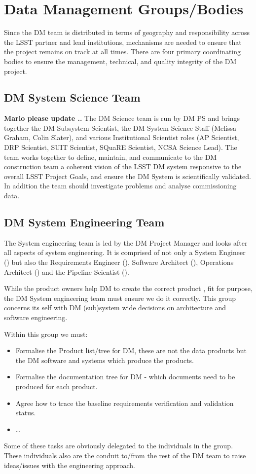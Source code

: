 \section{Data Management Groups/Bodies} \label{sect:groups}
Since the DM team is distributed in terms of geography and responsibility across the LSST partner and lead institutions, mechanisms are needed to ensure that the project remains on track at all times.  There are four primary coordinating bodies to ensure the management, technical, and quality integrity of the DM project.

\subsection{DM System Science Team \label{sect:dmsst}}
{\bf Mario  please update ..}
The DM Science team is run by DM PS and brings together the DM Subsystem Scientist, the DM System Science Staff (Melissa Graham, Colin Slater), and various Institutional Scientist roles (AP Scientist, DRP Scientist, SUIT Scientist, SQuaRE Scientist, NCSA Science Lead).
The team works together to define, maintain, and communicate to the DM construction team a coherent vision of the LSST DM system responsive to the overall LSST Project Goals, and ensure the DM System is scientifically validated. In addition the team should  investigate problems and analyse commissioning data.

\subsection{DM System Engineering Team \label{sect:sysengt}}
The System engineering team is led by the DM Project Manager and looks
after all aspects of system engineering. It is comprised of not only a System Engineer () but also the Requirements Engineer (), Software Architect (), Operations Architect () and the Pipeline Scientist ().

While the product owners help DM to create the correct product , fit for purpose, the DM System engineering team must ensure we do it correctly. This group concerns its self with DM (sub)system wide decisions on architecture and software engineering.

Within this  group we must:
\begin{itemize}
\item Formalise the Product list/tree for DM, these are not the data products but the DM software and systems which produce the products.
\item Formalise the documentation tree for DM - which documents need to be produced for each product.
\item Agree how to trace the baseline requirements verification and validation status.
\item  \ldots
\end{itemize}
 Some of these tasks are obviously delegated to the individuals in the group. These individuals also are the conduit to/from the rest of the DM team to raise ideas/issues with the engineering approach.

